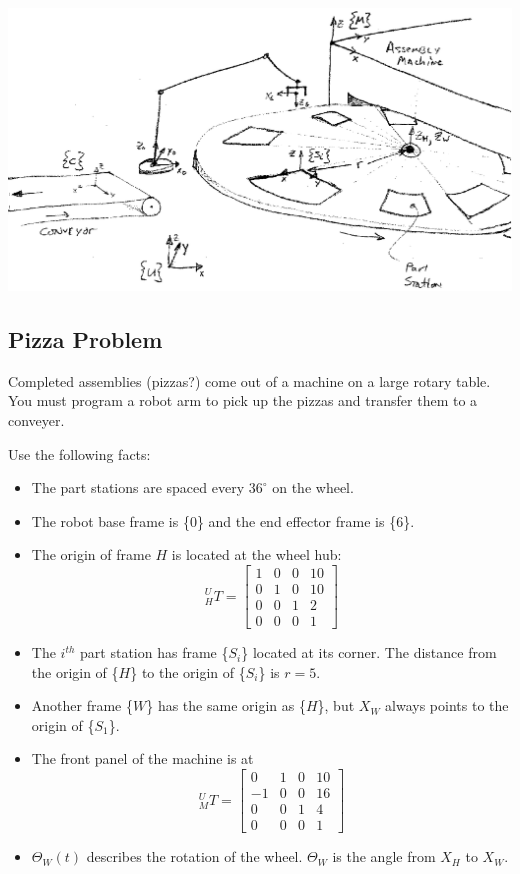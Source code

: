 \begin{Example}
\includegraphics[width=6.4in]{figs02/00080.eps}


\subsection*{Pizza Problem}
Completed assemblies (pizzas?) come out of a machine on a large rotary
table. You must program a robot arm to pick up the pizzas and transfer
them to a conveyer.


Use the following facts:

\begin{itemize}
	\item The part stations are spaced every $36^\circ$ on the wheel.

	\item The robot base frame is \{$0$\} and the end effector frame
is \{$6$\}.

	\item The origin of frame $H$ is located at the wheel hub:
\[
^U_HT =  \left[ \begin{array}{cccc}
1 & 0 & 0 & 10  \\
0 & 1 & 0 & 10 \\
0 & 0 & 1 & 2 \\
0 & 0 & 0 & 1
\end{array}  \right]
\]
	\item The $i^{th}$ part station has frame \{$S_i$\} located at its corner.
	The distance from the origin of \{$H$\} to the origin of \{$S_i$\}
	is $r=5$.
	\item Another frame \{$W$\} has the same origin as \{$H$\}, but $X_W$
always points to the origin of \{$S_1$\}.

	\item The front panel of the machine is at
\[
^U_MT =  \left[ \begin{array}{cccc}
0  & 1 & 0 & 10  \\
-1 & 0  &0  & 16 \\
0 & 0 & 1 & 4 \\
0 & 0 & 0 & 1
\end{array}  \right]
\]

	\item $\Theta_W(t)$ describes the rotation of the wheel.  $\Theta_W$ is
the angle from $X_H$ to $X_W$.

\end{itemize}



\end{Example}


